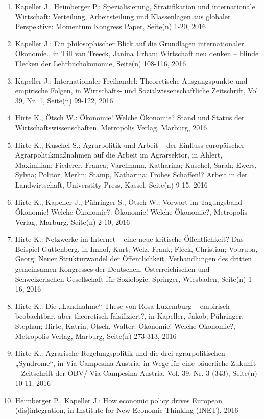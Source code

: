 \begin{enumerate}
	 \item Kapeller J., Heimberger P.: Spezialisierung, Stratifikation und internationale Wirtschaft: Verteilung, Arbeitsteilung und Klassenlagen aus globaler Perspektive: Momentum Kongress Paper, Seite(n) 1-20, 2016
	 \item Kapeller J.: Ein philosophischer Blick auf die Grundlagen internationaler Ökonomie., in Till van Treeck, Janina Urban: Wirtschaft neu denken – blinde Flecken der Lehrbuchökonomie, Seite(n) 108-116, 2016
	 \item Kapeller J.: Internationaler Freihandel: Theoretische Ausgangspunkte und empirische Folgen, in Wirtschafts- und Sozialwissenschaftliche Zeitschrift, Vol. 39, Nr. 1, Seite(n) 99-122, 2016
	 \item Hirte K., Ötsch W.: Ökonomie! Welche Ökonomie? Stand und Status der Wirtschaftswissenschaften, Metropolis Verlag, Marburg, 2016
	 \item Hirte K., Kuschel S.: Agrarpolitik und Arbeit – der Einfluss europäischer Agrarpolitikmaßnahmen auf die Arbeit im Agrarsektor, in Ahlert, Maximilian; Fiederer, Franca; Varelmann, Katharina; Kuschel, Sarah; Ewers, Sylvia; Politor, Merlin; Stamp, Katharina: Frohes Schaffen!? Arbeit in der Landwirtschaft, Universtity Press, Kassel, Seite(n) 9-15, 2016
	 \item Hirte K., Kapeller J., Pühringer S., Ötsch W.: Vorwort im Tagungsband Ökonomie! Welche Ökonomie?: Ökonomie! Welche Ökonomie?, Metropolis Verlag, Marburg, Seite(n) 2-10, 2016
	 \item Hirte K.: Netzwerke im Internet – eine neue kritische Öffentlichkeit? Das Beispiel Guttenberg, in Imhof, Kurt; Welz, Frank; Fleck, Christian; Vobruba, Georg: Neuer Strukturwandel der Öffentlichkeit. Verhandlungen des dritten gemeinsamen Kongresses der Deutschen, Österreichischen und Schweizerischen Gesellschaft für Soziologie, Springer, Wiesbaden, Seite(n) 1-16, 2016
	 \item Hirte K.: Die „Landnahme“-These von Rosa Luxemburg – empirisch beobachtbar, aber theoretisch falsifiziert?, in Kapeller, Jakob; Pühringer, Stephan; Hirte, Katrin; Ötsch, Walter: Ökonomie! Welche Ökonomie?, Metropolis Verlag, Marburg, Seite(n) 273-313, 2016
	 \item Hirte K.: Agrarische Regelungspolitik und die drei agrarpolitischen „Syndrome“, in Via Campesina Austria, in Wege für eine bäuerliche Zukunft – Zeitschrift der ÖBV/ Via Campesina Austria, Vol. 39, Nr. 3 (343), Seite(n) 10-11, 2016
	 \item Heimberger P., Kapeller J.: How economic policy drives European (dis)integration, in Institute for New Economic Thinking (INET), 2016

\end{enumerate}
